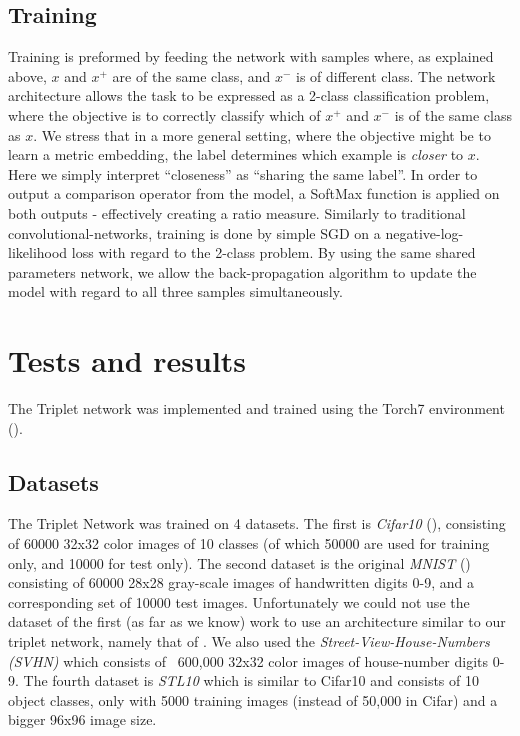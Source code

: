 \documentclass{article} %
\begin{document}
\subsection{Training}
Training is preformed by feeding the network with samples where, as explained above, $x$ and $x^{+}$ are of the same class, and $x^{-}$ is of different class.
The network architecture allows the task to be expressed as a 2-class classification problem, where the objective is to correctly classify  which of $x^+$ and $x^-$ is of the same class as $x$.
We stress that in a more general setting, where the objective might be to learn a metric embedding, 
the label determines which example is  \emph{closer} to $x$.
Here we simply interpret ``closeness'' as ``sharing the same label''.
In order to output a comparison operator from the model,
a SoftMax function is applied on both outputs - effectively creating a ratio measure.
Similarly to traditional convolutional-networks, training is done by simple SGD on a negative-log-likelihood loss with regard to the 2-class problem.
By using the same shared parameters network, we allow the back-propagation algorithm to update the model with regard to all three samples simultaneously.

\section{Tests and results}
 The Triplet network was implemented and trained using the Torch7 environment (\citet{collobert2011torch7}).
\subsection{Datasets}

The Triplet Network was trained on 4 datasets.  The first is \emph{Cifar10}  (\citet{krizhevsky2009learning}), consisting of 60000 32x32 color images of 10 classes (of which 50000 are used for training only, and 10000 for test only). 
The second dataset is the original \emph{MNIST} (\citet{lecun1998gradient}) consisting of 60000 28x28 gray-scale images of handwritten digits 0-9, and a corresponding set of 10000 test images.
Unfortunately we could not use the dataset of the first (as far as we know) work to use an architecture similar
to our triplet network, namely that of \cite{WangSLRWPCW2014}.
We also used the \emph{Street-View-House-Numbers (SVHN)} \citet{netzer2011reading} which consists of ~600,000 32x32 color images of house-number digits 0-9.
The fourth dataset is  \emph{STL10} \citet{coates2011analysis}  which is similar to Cifar10 and consists of 10 object classes, only with 5000 training images (instead of 50,000 in Cifar) and a bigger 96x96 image size.
\end{document}

